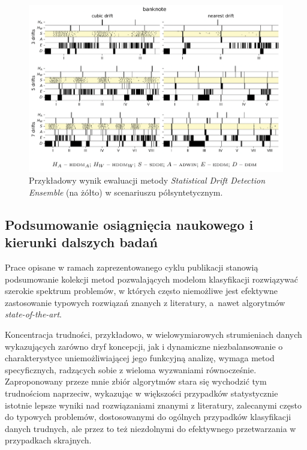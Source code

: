 \begin{figure}[!htb]
	\centering
	\includegraphics[width=\textwidth, clip=true, trim= 0 400 0 0]{figures/sdde2}
	\caption{Przykładowy wynik ewaluacji metody \emph{Statistical Drift Detection Ensemble} (na żółto) w scenariuszu półsyntetycznym.}\label{fig:sdde2}
\end{figure}

\subsection{Podsumowanie osiągnięcia naukowego i kierunki dalszych badań}

Prace opisane w ramach zaprezentowanego cyklu publikacji stanowią podsumowanie kolekcji metod pozwalających modelom klasyfikacji rozwiązywać szerokie spektrum problemów, w których często niemożliwe jest efektywne zastosowanie typowych rozwiązań znanych z literatury, a~nawet algorytmów \emph{state-of-the-art}. 

Koncentracja trudności, przykładowo, w wielowymiarowych strumieniach danych wykazujących zarówno dryf koncepcji, jak i dynamiczne niezbalansowanie o charakterystyce uniemożliwiającej jego funkcyjną analizę, wymaga metod specyficznych, radzących sobie z wieloma wyzwaniami równocześnie. Zaproponowany przeze mnie zbiór algorytmów stara się wychodzić tym trudnościom naprzeciw, wykazując w większości przypadków statystycznie istotnie lepsze wyniki nad rozwiązaniami znanymi z literatury, zalecanymi często do typowych problemów, dostosowanymi do ogólnych przypadków klasyfikacji danych trudnych, ale przez to też niezdolnymi do efektywnego przetwarzania w przypadkach skrajnych.

